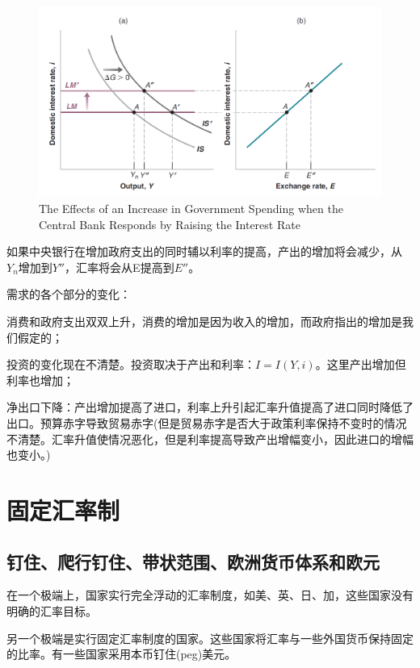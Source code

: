 \documentclass{article}
\begin{document}
\begin{figure}[H] %
	\centering %
	\includegraphics[width=1\textwidth]{19_5} %
	\caption{The Effects of an Increase
		in Government Spending
		when the Central Bank
		Responds by Raising the
		Interest Rate} %
	\label{Fig.main6} %
\end{figure}

如果中央银行在增加政府支出的同时辅以利率的提高，产出的增加将会减少，从$ Y_n $增加到$ Y'' $，汇率将会从E提高到$ E'' $。

需求的各个部分的变化：

消费和政府支出双双上升，消费的增加是因为收入的增加，而政府指出的增加是我们假定的；

投资的变化现在不清楚。投资取决于产出和利率：$ I=I(Y,i) $。这里产出增加但利率也增加；

净出口下降：产出增加提高了进口，利率上升引起汇率升值提高了进口同时降低了出口。预算赤字导致贸易赤字(但是贸易赤字是否大于政策利率保持不变时的情况不清楚。汇率升值使情况恶化，但是利率提高导致产出增幅变小，因此进口的增幅也变小。)


\section{固定汇率制}

\subsection{钉住、爬行钉住、带状范围、欧洲货币体系和欧元}

在一个极端上，国家实行完全浮动的汇率制度，如美、英、日、加，这些国家没有明确的汇率目标。

另一个极端是实行固定汇率制度的国家。这些国家将汇率与一些外国货币保持固定的比率。有一些国家采用本币钉住(peg)美元。
\end{document}
